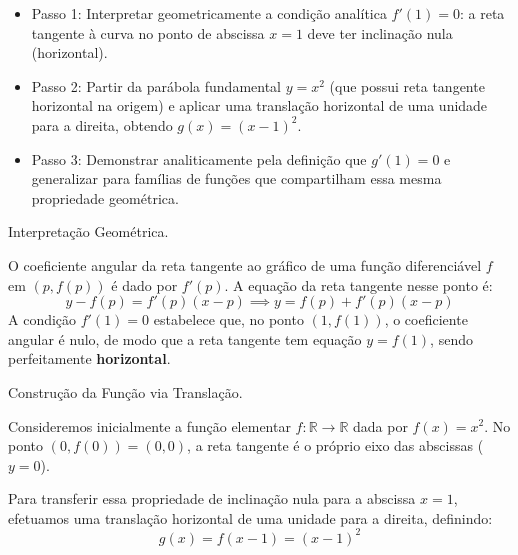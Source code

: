 \begin{estrategiabox}
  \begin{itemize}[noitemsep, topsep=2pt]
    \item Passo 1: Interpretar geometricamente a condição analítica $f'(1) = 0$: a reta tangente à curva no ponto de abscissa $x = 1$ deve ter inclinação nula (horizontal).
    \item Passo 2: Partir da parábola fundamental $y = x^2$ (que possui reta tangente horizontal na origem) e aplicar uma translação horizontal de uma unidade para a direita, obtendo $g(x) = (x - 1)^2$.
    \item Passo 3: Demonstrar analiticamente pela definição que $g'(1) = 0$ e generalizar para famílias de funções que compartilham essa mesma propriedade geométrica.
  \end{itemize}
\end{estrategiabox}

Interpretação Geométrica.

O coeficiente angular da reta tangente ao gráfico de uma função diferenciável $f$ em $(p, f(p))$ é dado por $f'(p)$. A equação da reta tangente nesse ponto é:
\[
y - f(p) = f'(p)(x - p) \implies y = f(p) + f'(p)(x - p)
\]
A condição $f'(1) = 0$ estabelece que, no ponto $(1, f(1))$, o coeficiente angular é nulo, de modo que a reta tangente tem equação $y = f(1)$, sendo perfeitamente \textbf{horizontal}.

Construção da Função via Translação.

Consideremos inicialmente a função elementar $f:\mathbb{R} \to \mathbb{R}$ dada por $f(x) = x^2$. No ponto $(0, f(0)) = (0, 0)$, a reta tangente é o próprio eixo das abscissas ($y = 0$). 

Para transferir essa propriedade de inclinação nula para a abscissa $x = 1$, efetuamos uma translação horizontal de uma unidade para a direita, definindo:
\[
g(x) = f(x - 1) = (x - 1)^2
\]

